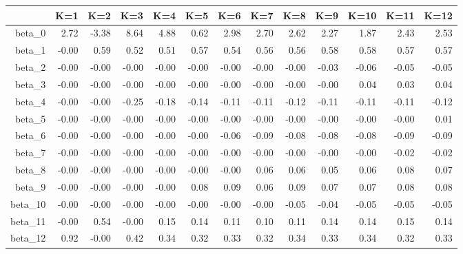 \begin{table}[ht]
\centering
\begin{tabular}{rrrrrrrrrrrrr}
  \hline
 & K=1 & K=2 & K=3 & K=4 & K=5 & K=6 & K=7 & K=8 & K=9 & K=10 & K=11 & K=12 \\ 
  \hline
beta\_0 & 2.72 & -3.38 & 8.64 & 4.88 & 0.62 & 2.98 & 2.70 & 2.62 & 2.27 & 1.87 & 2.43 & 2.53 \\ 
  beta\_1 & -0.00 & 0.59 & 0.52 & 0.51 & 0.57 & 0.54 & 0.56 & 0.56 & 0.58 & 0.58 & 0.57 & 0.57 \\ 
  beta\_2 & -0.00 & -0.00 & -0.00 & -0.00 & -0.00 & -0.00 & -0.00 & -0.00 & -0.03 & -0.06 & -0.05 & -0.05 \\ 
  beta\_3 & -0.00 & -0.00 & -0.00 & -0.00 & -0.00 & -0.00 & -0.00 & -0.00 & -0.00 & 0.04 & 0.03 & 0.04 \\ 
  beta\_4 & -0.00 & -0.00 & -0.25 & -0.18 & -0.14 & -0.11 & -0.11 & -0.12 & -0.11 & -0.11 & -0.11 & -0.12 \\ 
  beta\_5 & -0.00 & -0.00 & -0.00 & -0.00 & -0.00 & -0.00 & -0.00 & -0.00 & -0.00 & -0.00 & -0.00 & 0.01 \\ 
  beta\_6 & -0.00 & -0.00 & -0.00 & -0.00 & -0.00 & -0.06 & -0.09 & -0.08 & -0.08 & -0.08 & -0.09 & -0.09 \\ 
  beta\_7 & -0.00 & -0.00 & -0.00 & -0.00 & -0.00 & -0.00 & -0.00 & -0.00 & -0.00 & -0.00 & -0.02 & -0.02 \\ 
  beta\_8 & -0.00 & -0.00 & -0.00 & -0.00 & -0.00 & -0.00 & 0.06 & 0.06 & 0.05 & 0.06 & 0.08 & 0.07 \\ 
  beta\_9 & -0.00 & -0.00 & -0.00 & -0.00 & 0.08 & 0.09 & 0.06 & 0.09 & 0.07 & 0.07 & 0.08 & 0.08 \\ 
  beta\_10 & -0.00 & -0.00 & -0.00 & -0.00 & -0.00 & -0.00 & -0.00 & -0.05 & -0.04 & -0.05 & -0.05 & -0.05 \\ 
  beta\_11 & -0.00 & 0.54 & -0.00 & 0.15 & 0.14 & 0.11 & 0.10 & 0.11 & 0.14 & 0.14 & 0.15 & 0.14 \\ 
  beta\_12 & 0.92 & -0.00 & 0.42 & 0.34 & 0.32 & 0.33 & 0.32 & 0.34 & 0.33 & 0.34 & 0.32 & 0.33 \\ 
   \hline
\end{tabular}
\end{table}
